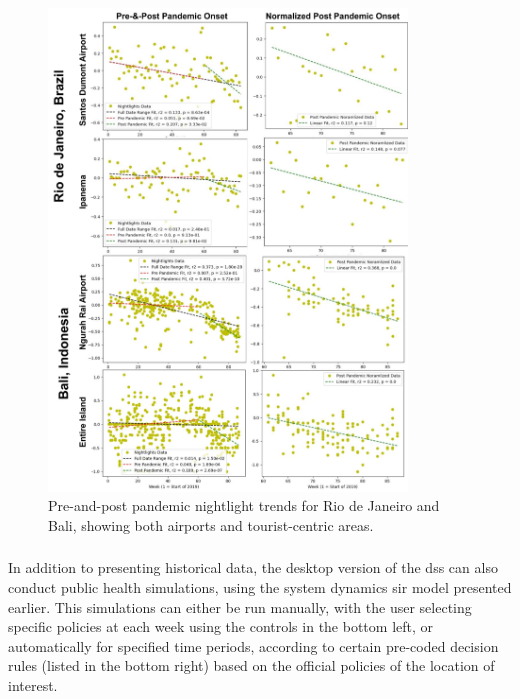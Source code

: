 \begin{figure}[H] 
\centering
\includegraphics[width=0.85\textwidth]{Figures/chap5/Nightlights_Graphs.png}
\caption[Nightlight Trends for Rio de Janeiro and Bali]{Pre-and-post pandemic nightlight trends for Rio de Janeiro and Bali, showing both airports and tourist-centric areas.}
\label{fig:nlg}
\end{figure}



\subsubsection{}

In addition to presenting historical data, the desktop version of the \ac{dss} can also conduct public health simulations, using the system dynamics \ac{sir} model presented earlier. This simulations can either be run manually, with the user selecting specific policies at each week using the controls in the bottom left, or automatically for specified time periods, according to certain pre-coded decision rules (listed in the bottom right) based on the official policies of the location of interest.

